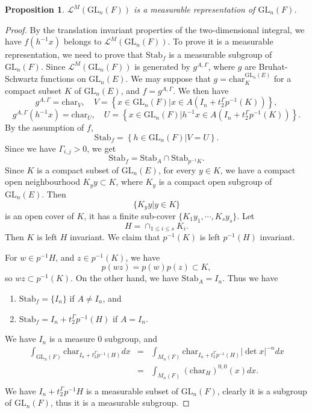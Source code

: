 \documentclass{amsart}
\newtheorem{proposition}[theorem]{Proposition}
\theoremstyle{definition}
\theoremstyle{remark}
\numberwithin{equation}{section}
\def  \Char     {\mathrm{char}}
\def  \GL        {\mathrm{GL}}
\def  \Stab     {\mathrm{Stab}}
\def  \cl       {\mathcal{L}}
\begin{document}
\begin{proposition}
 $\cl^M( \GL_n(F))$ is a measurable representation  of $\GL_n(F)$.
\end{proposition}


\begin{proof}
	By the translation invariant properties of the two-dimensional integral, we have $f(h^{-1}x) $ belongs to $\cl^M(\GL_n(F))$. To prove it is a measurable representation, we need to prove that 
$\mathrm{Stab}_f $ is  a measurable subgroup of $\GL_n(F)$.   Since $\cl^M(\GL_n(F))$ is generated by $g^{A, \Gamma}$, where $g$ are Bruhat-Schwartz functions on $\GL_n(E)$. We may suppose that $g = \Char^{\GL_n(E)}_K$ for a compact  subset $K$ of $\GL_n(E)$, and  $f = g^{A, \Gamma}$.  We then have
$$
g^{A, \Gamma} = \Char_V,   \quad   V=\left\{x \in \GL_n(F) |  x  \in  A(I_n+ t_2^{\Gamma} p^{-1}(K))  \right \},
$$
$$
g^{A, \Gamma} (h^{-1}x) = \Char_U,   \quad  U=\left\{x \in \GL_n(F) | h^{-1}x  \in  A(I_n+ t_2^{\Gamma} p^{-1}(K))  \right \}.
$$
By the assumption of $f$,
$$
\Stab_f = \left\{ h \in \GL_n(F)|  V=U \right\}.
$$
Since we have $\Gamma_{i,j} >0$, we get
$$
\Stab_f = \Stab_{A} \cap  \Stab_{p^{-1}K}.
$$
Since $K$ is a compact subset of $\GL_n(E)$,  for every $y \in K$, we have a compact open neighbourhood $K_yy \subset K$, where $K_y$ is a compact open subgroup of $\GL_n(E)$. Then 
$$
\{ K_yy| y \in K\}
$$ 
is an open cover of $K $, it has a finite  sub-cover $\{K_1y_1, \cdots,  K_sy_s \}$. Let
$$
H=  \cap_{1 \leq i \leq s} K_i.
$$
Then $K$ is left $H$ invariant. We claim that   $p^{-1}(K)$ is left $p^{-1}(H)$ invariant.

For  $w \in p^{-1}H$, and $z \in p^{-1}(K)$, we have
$$
p(wz)=p(w) p(z) \subset K,
$$
so $wz \subset p^{-1}(K)$.  On the other hand,  we have $\Stab_{A} =I_n$.  Thus  we have
\begin{enumerate}
	\item $\Stab_f=\{I_n\}$  if $A  \neq I_n$, and
	 \item  $\Stab_f =  I_n+ t_2^{\Gamma}p^{-1}(H)$ if $A= I_n$. 

\end{enumerate}
 We have $I_n$ is a measure $0$ subgroup, and 
\begin{eqnarray*}
	\int_{\GL_n(F)} \Char_{I_n+t_2^{\Gamma}p^{-1 }(H)}dx  &=& \int_{M_n (F)}  \Char_{I_n+t_2^{\Gamma}p^{-1}(H)} |\det x|^{-n}  dx  \\
	&=&\int_{M_n(F)} (\Char_H)^{0,0}(x) dx.  \\
 \end{eqnarray*}
We have $I_n+ t_2^{\Gamma}p^{-1}H$ is a measurable subset of $\GL_n(F)$,   clearly it is a subgroup of $\GL_n(F)$,  thus it is a measurable subgroup.
\end{proof}
\end{document}
